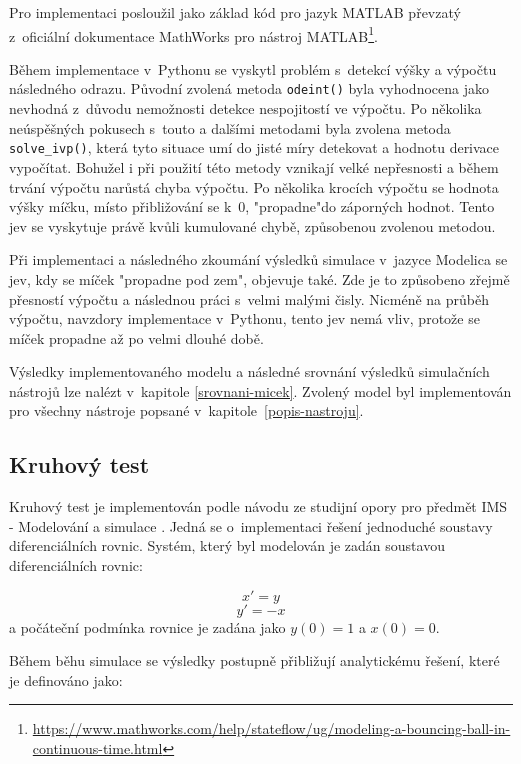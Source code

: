 Pro implementaci posloužil jako základ kód pro jazyk MATLAB převzatý z~oficiální dokumentace MathWorks pro nástroj MATLAB\footnote{\url{https://www.mathworks.com/help/stateflow/ug/modeling-a-bouncing-ball-in-continuous-time.html}}.

Během implementace v~Pythonu se vyskytl problém s~detekcí výšky a výpočtu následného odrazu. Původní zvolená metoda \texttt{odeint()} byla vyhodnocena jako nevhodná z~důvodu nemožnosti detekce nespojitostí ve výpočtu. Po několika neúspěšných pokusech s~touto a dalšími metodami byla zvolena metoda \texttt{solve\_ivp()}, která tyto situace umí do jisté míry detekovat a hodnotu derivace vypočítat. Bohužel i při použití této metody vznikají velké nepřesnosti a během trvání výpočtu narůstá chyba výpočtu. Po několika krocích výpočtu se hodnota výšky míčku, místo přibližování se k~0, "propadne"\space do záporných hodnot. Tento jev se vyskytuje právě kvůli kumulované chybě, způsobenou zvolenou metodou.

Při implementaci a následného zkoumání výsledků simulace v~jazyce Modelica se jev, kdy se míček "propadne pod zem", objevuje také. Zde je to způsobeno zřejmě přesností výpočtu a následnou práci s~velmi malými čisly. Nicméně na průběh výpočtu, navzdory implementace v~Pythonu, tento jev nemá vliv, protože se míček propadne až po velmi dlouhé době.

Výsledky implementovaného modelu a následné srovnání výsledků simulačních nástrojů lze nalézt v~kapitole \ref{srovnani-micek}.
Zvolený model byl implementován pro všechny nástroje popsané v~kapitole~\ref{popis-nastroju}.

\subsection*{Kruhový test}
\label{kruhovy-test}

Kruhový test je implementován podle návodu ze studijní opory pro předmět IMS - Modelování a simulace \cite{IMS-skripta}. Jedná se o~implementaci řešení jednoduché soustavy diferenciálních rovnic. Systém, který byl modelován je zadán soustavou diferenciálních rovnic:

\begin{equation}
   x' = y
\end{equation}
\begin{equation}
    y' = -x
\end{equation}
a počáteční podmínka rovnice je zadána jako $y(0) = 1$ a $x(0) = 0$.

Během běhu simulace se výsledky postupně přibližují analytickému řešení, které je definováno jako:

